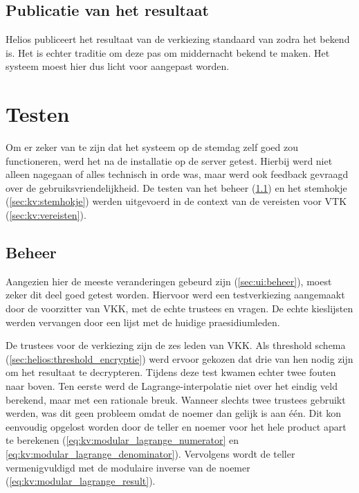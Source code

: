 \subsection{Publicatie van het resultaat}

Helios publiceert het resultaat van de verkiezing standaard van zodra het bekend is. Het is echter traditie om deze pas om middernacht bekend te maken. Het systeem moest hier dus licht voor aangepast worden.

\section{Testen}
\label{sec:kv:testen}

Om er zeker van te zijn dat het systeem op de stemdag zelf goed zou functioneren, werd het na de installatie op de server getest. Hierbij werd niet alleen nagegaan of alles technisch in orde was, maar werd ook feedback gevraagd over de gebruiksvriendelijkheid. De testen van het beheer (\ref{sec:kv:beheer}) en het stemhokje (\ref{sec:kv:stemhokje}) werden uitgevoerd in de context van de vereisten voor VTK (\ref{sec:kv:vereisten}).

\subsection{Beheer}
\label{sec:kv:beheer}

Aangezien hier de meeste veranderingen gebeurd zijn (\ref{sec:ui:beheer}), moest zeker dit deel goed getest worden. Hiervoor werd een testverkiezing aangemaakt door de voorzitter van VKK, met de echte trustees en vragen. De echte kieslijsten werden vervangen door een lijst met de huidige praesidiumleden.

\npar De trustees voor de verkiezing zijn de zes leden van VKK. Als threshold schema (\ref{sec:helios:threshold_encryptie}) werd ervoor gekozen dat drie van hen nodig zijn om het resultaat te decrypteren. Tijdens deze test kwamen echter twee fouten naar boven. Ten eerste werd de Lagrange-interpolatie niet over het eindig veld berekend, maar met een rationale breuk. Wanneer slechts twee trustees gebruikt werden, was dit geen probleem omdat de noemer dan gelijk is aan \'e\'en. Dit kon eenvoudig opgelost worden door de teller en noemer voor het hele product apart te berekenen (\ref{eq:kv:modular_lagrange_numerator} en \ref{eq:kv:modular_lagrange_denominator}). Vervolgens wordt de teller vermenigvuldigd met de modulaire inverse van de noemer (\ref{eq:kv:modular_lagrange_result}).

